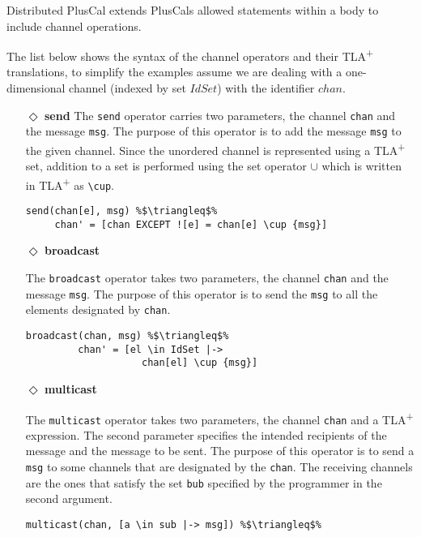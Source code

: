\documentclass[journal]{IEEEtran}
\newcommand{\tlaplus}{TLA\textsuperscript{+}\xspace}
\begin{document}
Distributed PlusCal extends PlusCals allowed statements within a body to include channel operations.

The list below shows the syntax of the channel operators and their \tlaplus translations, to simplify the examples assume we are dealing with a one-dimensional channel (indexed by set $IdSet$) with the identifier $chan$.

\begin{itemize}
\item[$\Diamond$]  \textbf{send} The \verb|send| operator carries two parameters, the channel \verb|chan| and the message \verb|msg|. The purpose of this operator is to add the message \verb|msg| to
the given channel. Since the unordered channel is represented using a \tlaplus set, addition to a set is performed using the set operator $\cup$ which is written in \tlaplus as \lstinline|\cup|.


\begin{lstlisting}[frame = none, numbers = none, escapechar=\%]
send(chan[e], msg) %$\triangleq$% 
     chan' = [chan EXCEPT ![e] = chan[e] \cup {msg}]
\end{lstlisting}


\item[$\Diamond$]  \textbf{broadcast}

The \verb|broadcast| operator takes two parameters, the channel \verb|chan| and the message \verb|msg|. The purpose of this operator is to send the \verb|msg| to all the elements designated by \verb|chan|.


\begin{lstlisting}[frame = none, numbers = none, escapechar=\%]
broadcast(chan, msg) %$\triangleq$% 
         chan' = [el \in IdSet |-> 
                    chan[el] \cup {msg}]
\end{lstlisting}

\item[$\Diamond$] \textbf{multicast}

The \verb|multicast| operator takes two parameters, the channel \verb|chan| and a \tlaplus expression. The second parameter specifies the intended recipients of the message and the message to be sent. The purpose of this operator is to send a \verb|msg| to some channels that are designated by the \verb|chan|. The receiving channels are the ones that satisfy the set \verb|bub| specified by the programmer in the second argument.


\begin{lstlisting}[frame = none, numbers = none, escapechar=\%]
multicast(chan, [a \in sub |-> msg]) %$\triangleq$%


\end{lstlisting}
\end{itemize}
\end{document}
